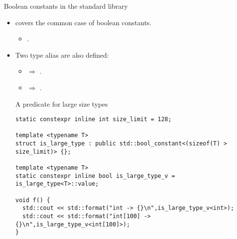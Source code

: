 \begin{frame}[t,fragile]{Boolean constants in the standard library}
\begin{itemize}
  \item {} covers the common case of boolean constants.
    \begin{itemize}
      \item {}.
    \end{itemize}

  \item Two type alias are also defined:
    \begin{itemize}
      \item {} $\Rightarrow$ \cppid{>}.
      \item {} $\Rightarrow$ \cppid{>}.
    \end{itemize}

\begin{block}{A predicate for large size types}
\begin{lstlisting}[basicstyle=\tiny]
static constexpr inline int size_limit = 128;

template <typename T>
struct is_large_type : public std::bool_constant<(sizeof(T) > size_limit)> {};

template <typename T>
static constexpr inline bool is_large_type_v = is_large_type<T>::value;

void f() {
  std::cout << std::format("int -> {}\n",is_large_type_v<int>);
  std::cout << std::format("int[100] -> {}\n",is_large_type_v<int[100]>); 
}
\end{lstlisting}
\end{block}
 
\end{itemize}
\end{frame}
